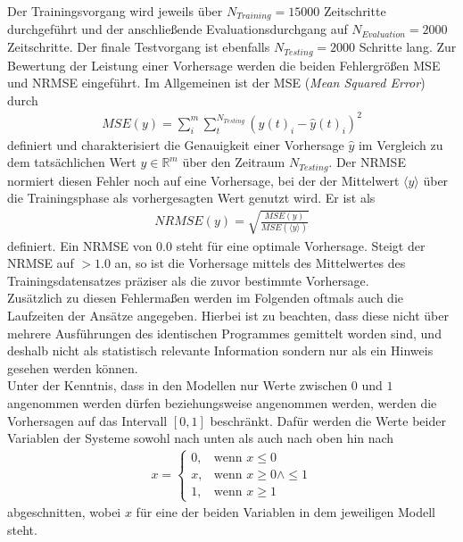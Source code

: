 Der Trainingsvorgang wird jeweils über $N_{Training}=15000$ Zeitschritte durchgeführt und der anschließende Evaluationsdurchgang auf $N_{Evaluation} = 2000$ Zeitschritte. Der finale Testvorgang ist ebenfalls $N_{Testing}=2000$ Schritte lang.
Zur Bewertung der Leistung einer Vorhersage werden die beiden Fehlergrößen MSE und NRMSE eingeführt. Im Allgemeinen ist der MSE (\textit{Mean Squared Error}) durch
\begin{align}
MSE(y) = \sum_i^m \sum_t^{N_{Testing}} \left(y(t)_i - \hat{y}(t)_i \right)^2
\end{align}
definiert und charakterisiert die Genauigkeit einer Vorhersage $\hat{y}$ im Vergleich zu dem tatsächlichen Wert $y \in \mathbb{R}^m$ über den Zeitraum $N_{Testing}$. Der NRMSE normiert diesen Fehler noch auf eine Vorhersage, bei der der Mittelwert $\langle y \rangle$ über die Trainingsphase als vorhergesagten Wert genutzt wird. Er ist als
\begin{align}
NRMSE(y) = \sqrt{\frac{MSE(y)}{MSE\left(\langle y \rangle\right)}}
\end{align}
definiert. Ein NRMSE von $0.0$ steht für eine optimale Vorhersage. Steigt der NRMSE auf $>1.0$ an, so ist die Vorhersage mittels des Mittelwertes des Trainingsdatensatzes präziser als die zuvor bestimmte Vorhersage.\\
Zusätzlich zu diesen Fehlermaßen werden im Folgenden oftmals auch die Laufzeiten der Ansätze angegeben. Hierbei ist zu beachten, dass diese nicht über mehrere Ausführungen des identischen Programmes gemittelt worden sind, und deshalb nicht als statistisch relevante Information sondern nur als ein Hinweis gesehen werden können.\\

Unter der Kenntnis, dass in den Modellen nur Werte zwischen $0$ und $1$ angenommen werden dürfen beziehungsweise angenommen werden, werden die Vorhersagen auf das Intervall $[0, 1]$ beschränkt. Dafür werden die Werte beider Variablen der Systeme sowohl nach unten als auch nach oben hin nach 
\begin{align}
x = \begin{cases}
	0,& \text{wenn } x \leq 0\\
	x,& \text{wenn } x \geq 0 \land \leq 1\\
    1,& \text{wenn } x \geq 1
\end{cases}
\end{align}
abgeschnitten, wobei $x$ für eine der beiden Variablen in dem jeweiligen Modell steht.\\

